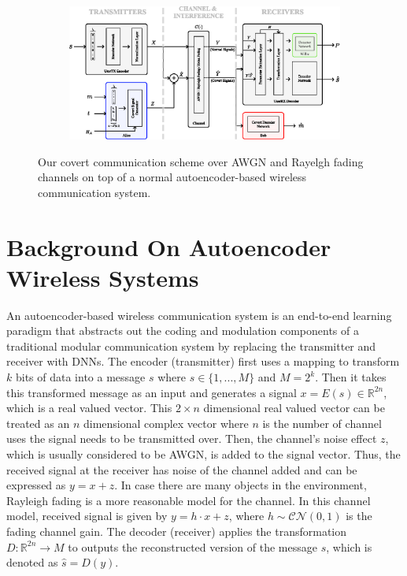 \begin{figure}[thp]
	\center
	\begin{subfigure}{0.85\textwidth}
	\includegraphics[width=\linewidth]{figs/system_architecture}
	\end{subfigure}
	\caption{Our covert communication scheme over AWGN and Rayelgh fading channels on top of a normal autoencoder-based wireless communication system.}	
	\label{fig:system_architecture}
\end{figure}
\section{Background On Autoencoder Wireless Systems}
\label{s:background}
An autoencoder-based wireless communication system is an end-to-end learning paradigm that abstracts out the coding and modulation components of a  traditional modular communication system by replacing the transmitter and receiver with DNNs. The encoder (transmitter) first uses a mapping to transform \(k\) bits of data into a message \(s\) where \(s \in \{1,...,M\}\) and \(M = 2^k\). Then it takes this transformed message as an input and generates a signal \(x = E(s) \in \mathbb{R}^{2n}\), which is a real valued vector. This \(2 \times n\) dimensional real valued vector can be treated as an \(n\) dimensional complex vector where \(n\) is the number of channel uses the signal needs to be transmitted over. Then, the channel's noise effect \(z\), which is usually considered to be AWGN, is added to the signal vector. Thus, the received signal at the receiver has noise of the channel added and can be expressed as \(y = x + z\). In case there are many objects in the environment, Rayleigh fading is a more reasonable model for the channel. In this channel model, received signal is given by \(y = h \cdot x + z\), where \(h \sim \mathcal{CN}(0, 1)\) is the fading channel gain. The decoder (receiver) applies the transformation \(D: \mathbb{R}^{2n} \rightarrow M \) to outputs the reconstructed version of the message \(s\), which is denoted as \(\hat{s} = D(y)\).
